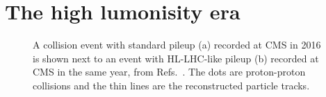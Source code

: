 \clearpage

\section{The high lumonisity era}
\begin{figure}[!htb]
    \centering
    \qquad
    \caption{
        A collision event with standard pileup (a) recorded at CMS in 2016 is shown next to an event with HL-LHC-like pileup (b) recorded at CMS in the same year, from Refs.~\cite{NormalPU2016, HighPU2016}.
        The dots are proton-proton collisions and the thin lines are the reconstructed particle tracks.
    }
    \label{fig:pileup}
\end{figure}
